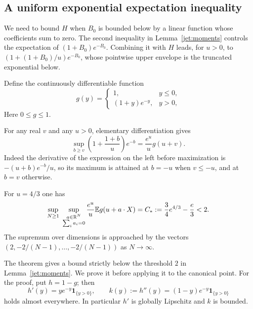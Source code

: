 \subsection{A uniform exponential expectation inequality}

We need to bound $H$ when $B_0$ is bounded below by a linear
function whose coefficients sum to zero. The second inequality in
Lemma~\ref{jet:moments} controls the expectation of $(1+B_0)e^{-B_0}$. Combining it with $H$
leads, for $u>0$, to $(1+(1+B_0)/u)e^{-B_0}$, whose pointwise upper envelope
is the truncated exponential below.

Define the continuously differentiable function
\begin{equation}\label{prob:g}
 g(y)=\begin{cases}
 1,&y\le0,\\
 (1+y)e^{-y},&y>0,
 \end{cases}
\end{equation}
Here $0\le g\le1$.

For any real $v$ and any $u>0$, elementary differentiation gives
\begin{equation}\label{jet:envelope}
 \sup_{b\ge v}\left(1+\frac{1+b}{u}\right)e^{-b}
       =\frac{e^u}{u}g(u+v).
\end{equation}
Indeed the derivative of the expression on the left before
maximization is $-(u+b)e^{-b}/u$, so its maximum is attained at
$b=-u$ when $v\le-u$, and at $b=v$ otherwise.

\begin{theorem}\label{prob:bound}
For $u=4/3$ one has
\begin{equation}\label{prob:universal-bound}
 \sup_{N\ge1}\ \sup_{\substack{a\in\mathbb R^N\\\sum_i a_i=0}}
 \frac{e^u}{u}\mathbb E g(u+a\cdot X)
 =C_*:=\frac34e^{4/3}-\frac e3<2.
\end{equation}
The supremum over dimensions is approached by the vectors
$(2,-2/(N-1),\ldots,-2/(N-1))$ as $N\to\infty$.
\end{theorem}

The theorem gives a bound strictly below the threshold $2$ in
Lemma~\ref{jet:moments}. We prove it before applying it to the
canonical point. For the proof, put $h=1-g$; then
\begin{equation}\label{prob:kernel}
 h'(y)=ye^{-y}\mathbf1_{\{y>0\}},\qquad
 k(y):=h''(y)=(1-y)e^{-y}\mathbf1_{\{y>0\}}
\end{equation}
holds almost everywhere. In particular $h'$ is globally Lipschitz and
$k$ is bounded.

